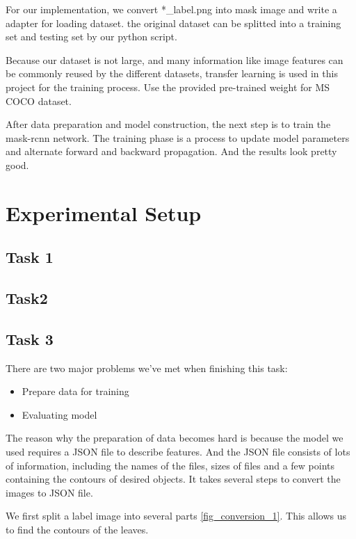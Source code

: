 \documentclass[conference]{IEEEtran}
\begin{document}
For our implementation, we convert *\_label.png into mask image and write a adapter for loading dataset.
the original dataset can be splitted into a training set and testing set by our python script.

Because our dataset is not large, and many information like image features can be commonly reused by the different datasets, 
transfer learning \cite{pan2009survey} is used in this project for the training process.
Use the provided pre-trained weight for MS COCO dataset\cite{Lin_2014}.

After data preparation and model construction, the next step is to train the mask-rcnn network.
The training phase is a process to update model parameters and alternate forward and backward propagation.
And the results look pretty good.

\section{Experimental Setup}
\subsection{Task 1}

\subsection{Task2}

\subsection{Task 3}

There are two major problems we've met when finishing this task: 
\begin{itemize}
\item Prepare data for training
\item Evaluating model
\end{itemize}
The reason why the preparation of data becomes hard is because the model we used requires a JSON file to describe features. And the JSON file consists of lots of information, including the names of the files, sizes of files and a few points containing the contours of desired objects. It takes several steps to convert the images to JSON file. 

We first split a label image into several parts \ref{fig_conversion_1}. This allows us to find the contours of the leaves.
\end{document}
